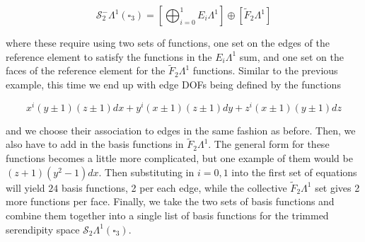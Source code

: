 \documentclass[format=acmsmall,screen,timestamp=false,a4paper]{acmart}
\newcommand{\calS}{\mathcal{S}}
\begin{document}
\begin{equation}
   \calS^-_2\Lambda^1(\square_3) =    \left[\bigoplus_{i=0}^{1} E_i \Lambda^1\right] \oplus \left[\tilde{F}_2 \Lambda^1\right]
   \end{equation}
   
\noindent where these require using two sets of functions, one set on the edges of the reference element to satisfy the functions in the $E_i\Lambda^1$ sum, and one set on the faces of the reference element for the $\tilde{F}_2\Lambda^1$ functions. Similar to the previous example, this time we end up with edge DOFs being defined by the functions 

\begin{equation*}
    x^i(y\pm 1)(z\pm 1)dx + y^i(x\pm 1)(z\pm 1) dy + z^i(x \pm 1)(y \pm 1)dz
\end{equation*}

\noindent and we choose their association to edges in the same fashion as before.  Then, we also have to add in the basis functions in $\tilde{F}_2\Lambda^1$.  The general form for these functions becomes a little more complicated, but one example of them would be $(z+1)(y^2-1)dx$.  Then substituting in $i=0, 1$ into the first set of equations will yield $24$ basis functions, 2 per each edge, while the collective $\tilde{F}_2\Lambda^1$ set gives 2 more functions per face.  Finally, we take the two sets of basis functions and combine them together into a single list of basis functions for the trimmed serendipity space $\mathcal{S}_2\Lambda^1(\square_3)$.  

 
 
\end{document}
